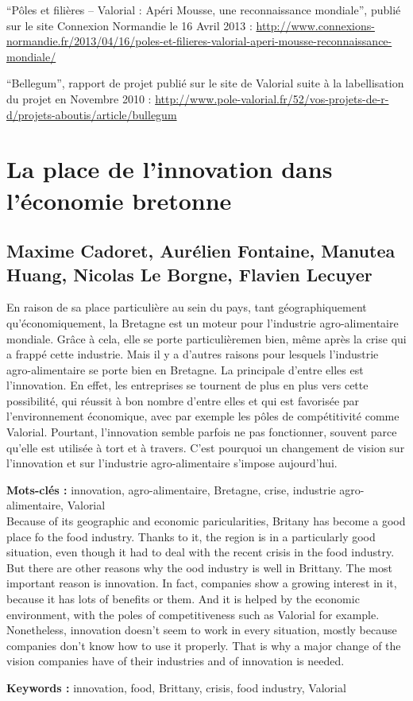 \documentclass[a4paper,12pt]{report}
\begin{document}
“Pôles et filières – Valorial : Apéri Mousse, une reconnaissance mondiale”, publié sur le site Connexion Normandie le 16 Avril 2013 : \url{http://www.connexions-normandie.fr/2013/04/16/poles-et-filieres-valorial-aperi-mousse-reconnaissance-mondiale/}

“Bellegum”, rapport de projet publié sur le site de Valorial suite à la labellisation du projet en Novembre 2010 : \url{http://www.pole-valorial.fr/52/vos-projets-de-r-d/projets-aboutis/article/bullegum}

{}

\cleardoublepage

\begin{minipage}{\textwidth}	%
	\chapter*{La place de l'innovation dans l'économie bretonne}
	
	\section*{Maxime Cadoret, Aurélien Fontaine, Manutea Huang, Nicolas Le Borgne, Flavien Lecuyer}

	En raison de sa place particulière au sein du pays, tant géographiquement qu'économiquement, la Bretagne est un moteur pour l'industrie agro-alimentaire mondiale. Grâce à cela, elle se porte particulièremen bien, même après la crise qui a frappé cette industrie. Mais il y a d'autres raisons pour lesquels l'industrie agro-alimentaire se porte bien en Bretagne. La principale d'entre elles est l'innovation. En effet, les entreprises se tournent de plus en plus vers cette possibilité, qui réussit à bon nombre d'entre elles et qui est favorisée par l'environnement économique, avec par exemple les pôles de compétitivité comme Valorial. Pourtant, l'innovation semble parfois ne pas fonctionner, souvent parce qu'elle est utilisée à tort et à travers. C'est pourquoi un changement de vision sur l'innovation et sur l'industrie agro-alimentaire s'impose aujourd'hui.
	
	\textbf{Mots-clés : }innovation, agro-alimentaire, Bretagne, crise, industrie agro-alimentaire, Valorial\\

	Because of its geographic and economic paricularities, Britany has become a good place fo the food industry. Thanks to it, the region is in a particularly good situation, even though it had to deal with the recent crisis in the food industry. But there are other reasons why the ood industry is well in Brittany. The most important reason is innovation. In fact, companies show a growing interest in it, because it has lots of benefits or them. And it is helped by the economic environment, with the poles of competitiveness such as Valorial for example. Nonetheless, innovation doesn't seem to work in every situation, mostly because companies don't know how to use it properly. That is why a major change of the vision companies have of their industries and of innovation is needed.

	\textbf{Keywords : }innovation, food, Brittany, crisis, food industry, Valorial
\end{minipage}
\end{document}
